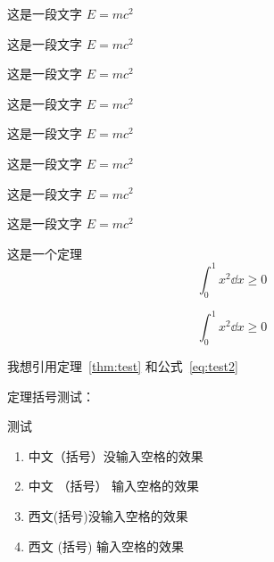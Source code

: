 \begin{corollary}
  这是一段文字 $E = m c^2$
\end{corollary}

\begin{lemma}
  这是一段文字 $E = m c^2$
\end{lemma}

\begin{axiom}
  这是一段文字 $E = m c^2$
\end{axiom}

\begin{counterexample}
  这是一段文字 $E = m c^2$
\end{counterexample}

\begin{conjecture}
  这是一段文字 $E = m c^2$
\end{conjecture}

\begin{question}
  这是一段文字 $E = m c^2$
\end{question}

\begin{claim}
  这是一段文字 $E = m c^2$
\end{claim}

\begin{remark}
  这是一段文字 $E = m c^2$
\end{remark}

\begin{theorem}[Cauchy]\label{thm:test}
  这是一个定理
  \begin{equation}\label{eq:test1}
    \int_{0}^{1} x^2 \dd{x} \geq 0
  \end{equation}

  \begin{equation}\label{eq:test2}
    \int_{0}^{1} x^2 \dd{x} \geq 0
  \end{equation}
\end{theorem}

我想引用定理~\ref{thm:test} 和公式~\ref{eq:test2}


定理括号测试：

\begin{theorem}
  测试
  \begin{enumerate}
    \item 中文（括号）没输入空格的效果
    \item 中文 （括号） 输入空格的效果
    \item 西文(括号)没输入空格的效果
    \item 西文 (括号) 输入空格的效果
  \end{enumerate}
\end{theorem} 


